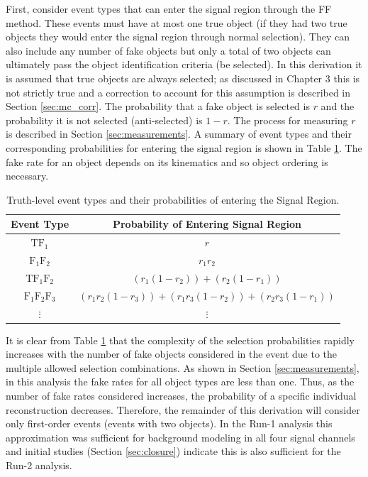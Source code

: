 First, consider event types that can enter the signal region through the FF method. These events must have at most one true object (if they had two true objects they would enter the signal region through normal selection). They can also include any number of fake objects but only a total of two objects can ultimately pass the object identification criteria (be selected). In this derivation it is assumed that true objects are always selected; as discussed in Chapter 3 this is not strictly true and a correction to account for this assumption is described in Section \ref{sec:mc_corr}. The probability that a fake object is selected is $r$ and the probability it is not selected (anti-selected) is $1-r$. The process for measuring $r$ is described in Section \ref{sec:measurements}. A summary of event types and their corresponding probabilities for entering the signal region is shown in Table \ref{tab:ff_1}. The fake rate for an object depends on its kinematics and so object ordering is necessary.\\

\begin{table}[htb!]
    \centering
    \begin{tabular}{|c|c|}
    \hline
        \textbf{Event Type} &  \textbf{Probability of Entering Signal Region}\\
        \hline
        $\text{TF}_1$ & $r$\\
        $\text{F}_1\text{F}_2$ & $r_1 r_2$\\
        $\text{TF}_1\text{F}_2$ & $(r_1 (1-r_2))+(r_2 (1-r_1))$\\
        $\text{F}_1\text{F}_2\text{F}_3$ & $(r_1 r_2(1-r_3))+(r_1 r_3(1-r_2))+(r_2r_3(1-r_1))$\\
        $\vdots$ & $\vdots$\\
        \hline
    \end{tabular}
    \caption{Truth-level event types and their probabilities of entering the Signal Region.}
    \label{tab:ff_1}
\end{table}

It is clear from Table \ref{tab:ff_1} that the complexity of the selection probabilities rapidly increases with the number of fake objects considered in the event due to the multiple allowed selection combinations. As shown in Section \ref{sec:measurements}, in this analysis the fake rates for all object types are less than one. Thus, as the number of fake rates considered increases, the probability of a specific individual reconstruction decreases.  Therefore, the remainder of this derivation will consider only first-order events (events with two objects). In the Run-1 analysis this approximation was sufficient for background modeling in all four signal channels and initial studies (Section \ref{sec:closure}) indicate this is also sufficient for the Run-2 analysis.\\

